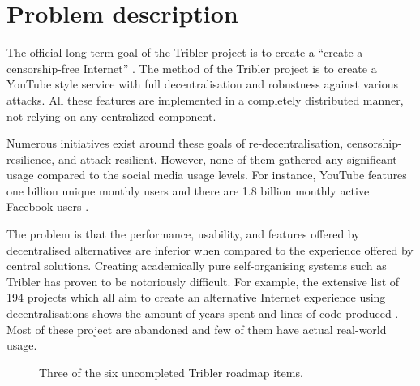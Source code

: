 \chapter{Problem description}
\label{chp:problem-description}

The official long-term goal of the Tribler project is to create a \enquote{create a censorship-free Internet} \cite{pouwelse2012moving}.
The method of the Tribler project is to create a YouTube style service with full decentralisation and robustness against various attacks.
All these features are implemented in a completely distributed manner, not relying on any centralized component.

Numerous initiatives exist around these goals of re-decentralisation, censorship-resilience, and attack-resilient.
However, none of them gathered any significant usage compared to the social media usage levels. 
For instance, YouTube features one billion unique monthly users \cite{mainka2014government} and there are 1.8 billion monthly active Facebook users \cite{sharma2016strategies}.

The problem is that the performance, usability, and features offered by decentralised alternatives are inferior when compared to the experience offered by central solutions.
Creating academically pure self-organising systems such as Tribler has proven to be notoriously difficult.
For example, the extensive list of 194 projects which all aim to create an alternative Internet experience using decentralisations shows the amount of years spent and lines of code produced \cite{redecentralize2016alternative}.
Most of these project are abandoned and few of them have actual real-world usage.

\begin{figure}[!h]
	\caption{Three of the six uncompleted Tribler roadmap items.}
	\label{fig:tribler_roadmap}
\end{figure}


